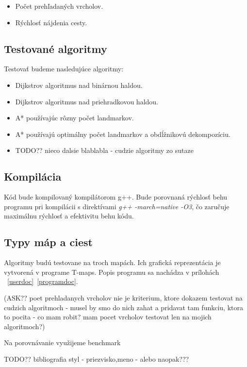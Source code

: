 \begin{itemize}
\item Počet prehľadaných vrcholov.
\item Rýchlosť nájdenia cesty.
\end{itemize}


\subsection{Testované algoritmy}
Testovať budeme nasledujúce algoritmy:
\begin{itemize}
\item Dijkstrov algoritmus nad binárnou haldou.
\item Dijkstrov algoritmus nad priehradkovou haldou.
\item A* používajúc rôzny počet landmarkov.
\item A* používajú optimálny počet landmarkov a obdĺžnikovú dekompozíciu.
\item TODO?? nieco dalsie blablabla - cudzie algoritmy zo sutaze
\end{itemize}


\subsection{Kompilácia}
Kód bude kompilovaný kompilátorom g++. Bude porovnaná
rýchlosť behu programu pri kompilácii s direktívami \emph{g++ -march=native -O3}, čo zaručuje maximálnu rýchlosť a efektivitu behu kódu.

\subsection{Typy máp a ciest}
Algoritmy budú testovane na troch mapách. 
Ich grafická reprezentácia je vytvorená v programe T-maps.
Popis programu sa nachádza v prílohách ~\ref{userdoc}~\ref{programdoc}.







(ASK?? poet prehladanych vrcholov nie je kriterium, ktore dokazem testovat na cudzich algoritmoch - musel by smo do nich zahat a pridavat tam funkciu, ktora to pocita - co mam robit? mam pocet vrcholov testovat len na mojich algoritmoch?)




Na porovnávanie využijeme benchmark

TODO?? bibliografia styl - priezvisko,meno - alebo naopak???